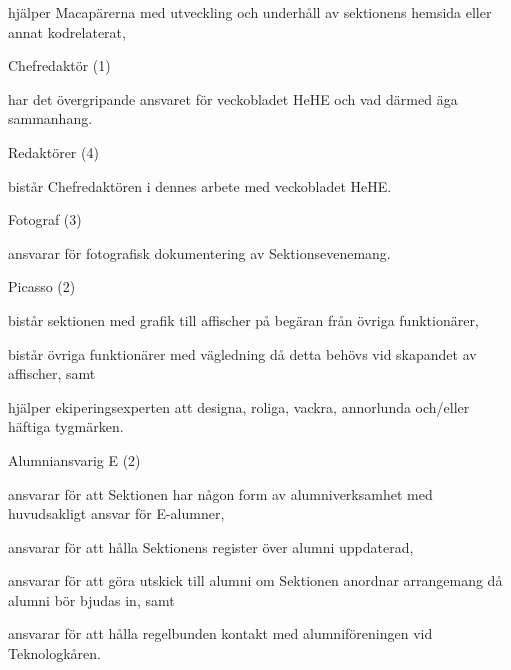 \documentclass[10pt]{article}
\begin{document}
\begin{emptylist}
        \begin{dashlist}
            \item hjälper Macapärerna med utveckling och underhåll av
                sektionens hemsida eller annat kodrelaterat,
        \end{dashlist}
    \item Chefredaktör (1)
    		\begin{dashlist}
    			\item har det övergripande ansvaret för veckobladet HeHE och vad därmed äga sammanhang.
    		\end{dashlist}
    	\item Redaktörer (4)
    		\begin{dashlist}
    			\item bistår Chefredaktören i dennes arbete med veckobladet HeHE.
    		\end{dashlist}
    \item Fotograf (3)
        \begin{dashlist}
            \item ansvarar för fotografisk dokumentering av Sektionsevenemang.
        \end{dashlist}
    \item Picasso (2)
		\begin{dashlist}
            \item bistår sektionen med grafik till affischer på begäran från övriga funktionärer,
            \item bistår övriga funktionärer med vägledning då detta behövs vid skapandet av affischer, samt
            \item hjälper ekiperingsexperten att designa, roliga, vackra, annorlunda och/eller häftiga tygmärken.
        \end{dashlist}
    \item Alumniansvarig E (2)
        \begin{dashlist}
            \item ansvarar för att Sektionen har någon form av alumniverksamhet med huvudsakligt ansvar för E-alumner,
            \item ansvarar för att hålla Sektionens register över alumni uppdaterad,
            \item ansvarar för att göra utskick till alumni om Sektionen anordnar arrangemang då alumni
bör bjudas in, samt
            \item  ansvarar för att hålla regelbunden kontakt med alumniföreningen vid Teknologkåren.
        \end{dashlist}

\end{emptylist}
\end{document}
